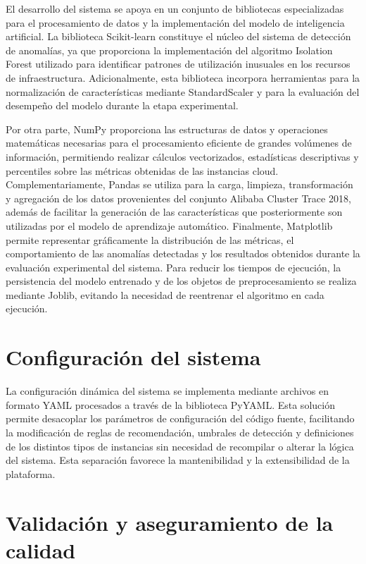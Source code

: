 El desarrollo del sistema se apoya en un conjunto de bibliotecas
especializadas para el procesamiento de datos y la implementación del
modelo de inteligencia artificial. La biblioteca Scikit-learn constituye
el núcleo del sistema de detección de anomalías, ya que proporciona la
implementación del algoritmo Isolation Forest utilizado para identificar
patrones de utilización inusuales en los recursos de infraestructura.
Adicionalmente, esta biblioteca incorpora herramientas para la
normalización de características mediante StandardScaler y para la
evaluación del desempeño del modelo durante la etapa experimental.

Por otra parte, NumPy proporciona las estructuras de datos y operaciones
matemáticas necesarias para el procesamiento eficiente de grandes
volúmenes de información, permitiendo realizar cálculos vectorizados,
estadísticas descriptivas y percentiles sobre las métricas obtenidas de
las instancias cloud. Complementariamente, Pandas se utiliza para la
carga, limpieza, transformación y agregación de los datos provenientes
del conjunto Alibaba Cluster Trace 2018, además de facilitar la
generación de las características que posteriormente son utilizadas por
el modelo de aprendizaje automático. Finalmente, Matplotlib permite
representar gráficamente la distribución de las métricas, el
comportamiento de las anomalías detectadas y los resultados obtenidos
durante la evaluación experimental del sistema. Para reducir los tiempos
de ejecución, la persistencia del modelo entrenado y de los objetos de
preprocesamiento se realiza mediante Joblib, evitando la necesidad de
reentrenar el algoritmo en cada ejecución.

\section{Configuración del sistema}

La configuración dinámica del sistema se implementa mediante archivos en
formato YAML procesados a través de la biblioteca PyYAML. Esta solución
permite desacoplar los parámetros de configuración del código fuente,
facilitando la modificación de reglas de recomendación, umbrales de
detección y definiciones de los distintos tipos de instancias sin
necesidad de recompilar o alterar la lógica del sistema. Esta separación
favorece la mantenibilidad y la extensibilidad de la plataforma.

\section{Validación y aseguramiento de la calidad}

